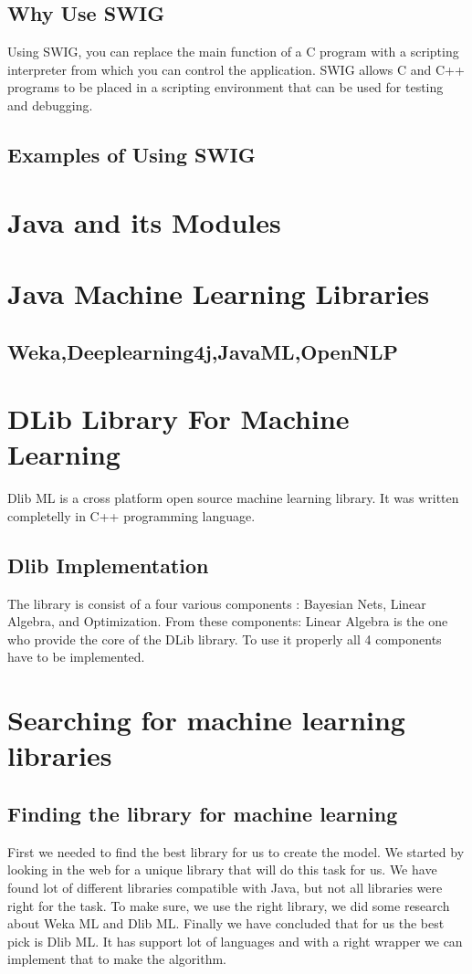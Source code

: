 \documentclass[english,12pt,oneside,a4paper]{article}
\begin{document}
\begin{center}
		\subsection{Why Use SWIG}
		Using SWIG, you can replace the main function of a C program with a scripting interpreter from which you can control the application. SWIG allows C and C++ programs to be placed in a scripting environment that can be used for testing and debugging.
		
		\subsection{Examples of Using SWIG}
		
		\section{Java and its Modules}
		
		\section{Java Machine Learning Libraries}
		
		\subsection{Weka,Deeplearning4j,JavaML,OpenNLP}
		
		\section{DLib Library For Machine Learning}
		Dlib ML is a cross platform open source machine learning library. It was written completelly in C++ programming language.
		\subsection{Dlib Implementation}
		The library is consist of a four various components : Bayesian Nets, Linear Algebra, and Optimization. From these components: Linear Algebra is the one who provide the core of the DLib library. To use it properly all 4 components have to be implemented.
		\section{Searching for machine learning libraries}
	
		\subsection{Finding the library for machine learning}
		First we needed to find the best library for us to create the model.
		We started by looking in the web for a unique library that will do this task for us. We have found lot of different libraries compatible with Java, but not all libraries were right for the task. To make sure, we use the right library, we did some research about Weka ML and Dlib ML.
		Finally we have concluded that for us the best pick is Dlib ML. It has support lot of languages and with a right wrapper we can implement that to make the algorithm.

\end{center}
\end{document}
